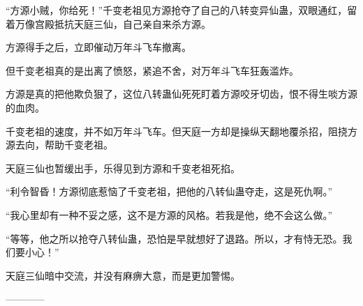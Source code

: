 \begin{this_body}
“方源小贼，你给死！”千变老祖见方源抢夺了自己的八转变异仙蛊，双眼通红，留着万像宫殿抵抗天庭三仙，自己亲自来杀方源。

方源得手之后，立即催动万年斗飞车撤离。

但千变老祖真的是出离了愤怒，紧追不舍，对万年斗飞车狂轰滥炸。

方源是真的把他欺负狠了，这位八转蛊仙死死盯着方源咬牙切齿，恨不得生啖方源的血肉。

千变老祖的速度，并不如万年斗飞车。但天庭一方却是操纵天翻地覆杀招，阻挠方源去向，帮助千变老祖。

天庭三仙也暂缓出手，乐得见到方源和千变老祖死掐。

“利令智昏！方源彻底惹恼了千变老祖，把他的八转仙蛊夺走，这是死仇啊。”

“我心里却有一种不妥之感，这不是方源的风格。若我是他，绝不会这么做。”

“等等，他之所以抢夺八转仙蛊，恐怕是早就想好了退路。所以，才有恃无恐。我们要小心！”

天庭三仙暗中交流，并没有麻痹大意，而是更加警惕。

------------

\end{this_body}

